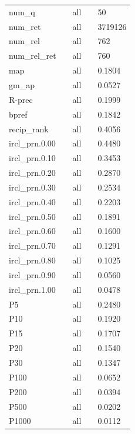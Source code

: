 \begin{center}
\begin{tabular}{ l l l l l}

num\_q      &&     all &&    50\\
num\_ret     &&    all  &&   3719126\\
num\_rel     &&    all   &&  762\\
num\_rel\_ret &&    all&&     760\\
map        &&     all     &&0.1804\\
gm\_ap      &&     all   &&  0.0527\\
R-prec        &&  all    && 0.1999\\
bpref         &&  all     &&0.1842\\
recip\_rank   &&   all  &&   0.4056\\
ircl\_prn.0.00  && all &&    0.4480\\
ircl\_prn.0.10  && all &&    0.3453\\
ircl\_prn.0.20  && all &&    0.2870\\
ircl\_prn.0.30  && all &&    0.2534\\
ircl\_prn.0.40  && all &&    0.2203\\
ircl\_prn.0.50  && all &&    0.1891\\
ircl\_prn.0.60  && all &&    0.1600\\
ircl\_prn.0.70  && all &&    0.1291\\
ircl\_prn.0.80  && all &&    0.1025\\
ircl\_prn.0.90  && all &&    0.0560\\
ircl\_prn.1.00  && all &&    0.0478\\
P5           &&   all   &&  0.2480\\
P10          &&   all  &&   0.1920\\
P15          &&   all  &&   0.1707\\
P20          &&   all  &&   0.1540\\
P30          &&   all  &&   0.1347\\
P100        &&    all &&    0.0652\\
P200        &&    all &&    0.0394\\
P500        &&    all &&    0.0202\\
P1000      &&     all&&     0.0112

\end{tabular}
\end{center}




